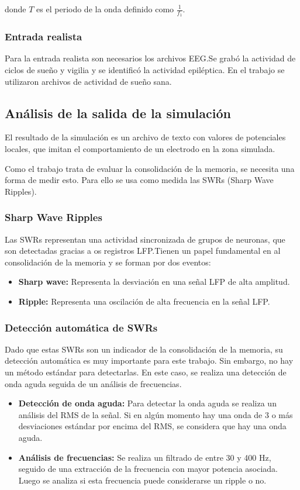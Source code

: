 \documentclass[12pt, letterpaper]{article}
\begin{document}
donde $T$ es el periodo de la onda definido como $\frac{1}{f_1}$. 

\subsubsection{Entrada realista}
Para la entrada realista son necesarios los archivos EEG.\@ Se grabó la actividad de ciclos de sueño y vigilia y se identificó la actividad epiléptica. En el trabajo se utilizaron archivos de actividad de sueño sana.

\subsection{Análisis de la salida de la simulación}
El resultado de la simulación es un archivo de texto con valores de potenciales locales, que imitan el comportamiento de un electrodo en la zona simulada. 

Como el trabajo trata de evaluar la consolidación de la memoria, se necesita una forma de medir esto. Para ello se usa como medida las SWRs (Sharp Wave Ripples).

\subsubsection{Sharp Wave Ripples}
Las SWRs representan una actividad sincronizada de grupos de neuronas, que son detectadas gracias a os registros LFP.\@ Tienen un papel fundamental en al consolidación de la memoria y se forman por dos eventos:
\begin{itemize}
    \item \textbf{Sharp wave:} Representa la desviación en una señal LFP de alta amplitud.
    \item \textbf{Ripple:} Representa una oscilación de alta frecuencia en la señal LFP.\@
\end{itemize}

\subsubsection{Detección automática de SWRs}
Dado que estas SWRs son un indicador de la consolidación de la memoria, su detección automática es muy importante para este trabajo. Sin embargo, no hay un método estándar para detectarlas. En este caso, se realiza una detección de onda aguda seguida de un análisis de frecuencias.

\begin{itemize}
    \item \textbf{Detección de onda aguda:} Para detectar la onda aguda se realiza un análisis del RMS de la señal. Si en algún momento hay una onda de 3 o más desviaciones estándar por encima del RMS, se considera que hay una onda aguda.
    \item \textbf{Análisis de frecuencias:} Se realiza un filtrado de entre 30 y 400 Hz, seguido de una extracción de la frecuencia con mayor potencia asociada. Luego se analiza si esta frecuencia puede considerarse un ripple o no.
\end{itemize}
\end{document}
